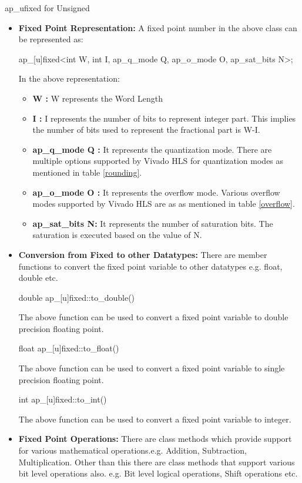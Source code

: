\hspace{3cm}ap\_ufixed for Unsigned
\begin{itemize}
\item
\textbf{Fixed Point Representation:}
A fixed point number in the above class can be represented as:

ap\_[u]fixed\textless int W, int I, ap\_q\_mode Q, ap\_o\_mode O, ap\_sat\_bits N\textgreater;

In the above representation:
\begin{itemize}
\item
\textbf{W :} W represents the Word Length
\item
\textbf{I :} I represents the number of bits to represent integer part. This implies the number of bits used to represent the fractional part is W-I.
\item
\textbf{ap\_q\_mode Q :} It represents the quantization mode. There are multiple options supported by Vivado HLS for quantization modes as mentioned in table \ref{rounding}.

\item
\textbf{ ap\_o\_mode O :} It represents the overflow mode. Various overflow modes supported by Vivado HLS are as as mentioned in table \ref{overflow}.


\item
\textbf{ap\_sat\_bits N:} It represents the number of saturation bits. The saturation is executed based on the value of N.
\end{itemize}

\item
\textbf{Conversion from Fixed to other Datatypes:}
There are member functions to convert the fixed point variable to other datatypes e.g. float, double etc. 

\hspace{3cm} double ap\_[u]fixed::to\_double()

The above function can be used to convert a fixed point variable to double precision floating point.

\hspace{3cm} float ap\_[u]fixed::to\_float()

The above function can be used to convert a fixed point variable to single precision floating point.

\hspace{3cm} int ap\_[u]fixed::to\_int()

The above function can be used to convert a fixed point variable to integer.

\item
\textbf{Fixed Point Operations:} There are class methods which provide support for various mathematical operations.e.g. Addition, Subtraction, Multiplication. Other than this there are class methods that support various bit level operations also. e.g. Bit level logical operations, Shift operations etc.  
\end{itemize}

